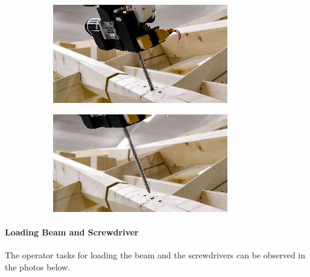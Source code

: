 \documentclass[11pt]{book}
\begin{document}
\begin{figure}[H]
\centering
\begin{subfigure}[b]{0.45\textwidth}
\centering
\includegraphics[width=\textwidth]{./images/image47.jpeg}
\end{subfigure}
\hfill
\begin{subfigure}[b]{0.45\textwidth}
\centering
\includegraphics[width=\textwidth]{./images/image48.jpeg}
\end{subfigure}
\end{figure}


\paragraph{Loading Beam and Screwdriver}

The operator tasks for loading the beam and the screwdrivers can be observed in the photos below. 
\end{document}
